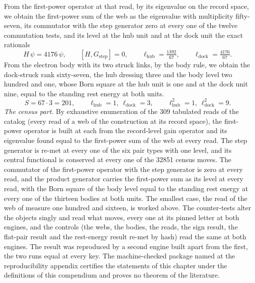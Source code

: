 \begin{chproof}
\begin{equation}
\end{equation}
From the first-power operator at that read, by its eigenvalue on the record space, we obtain the first-power sum of the web as the eigenvalue with multiplicity fifty-seven, its commutator with the step generator zero at every one of the twelve commutation tests, and its level at the hub unit and at the dock unit the exact rationals
\begin{equation}
H\,\psi = 4176\,\psi, \qquad [H, G_{\mathrm{step}}] = 0, \qquad \ell_{\mathrm{hub}} = \tfrac{1392}{67}, \qquad \ell_{\mathrm{dock}} = \tfrac{4176}{67} .
\end{equation}
From the electron body with its two struck links, by the body rule, we obtain the dock-struck rank sixty-seven, the hub dressing three and the body level two hundred and one, whose Born square at the hub unit is one and at the dock unit nine, equal to the standing rest energy at both units.
\begin{equation}
S = 67 \cdot 3 = 201, \qquad \ell_{\mathrm{hub}} = 1,\ \ell_{\mathrm{dock}} = 3, \qquad \ell_{\mathrm{hub}}^{2} = 1,\ \ell_{\mathrm{dock}}^{2} = 9 .
\end{equation}
\textit{The census part.}
By exhaustive enumeration of the 309 tabulated reads of the catalog (every read of a web of the construction at its record space), the first-power operator is built at each from the record-level gain operator and its eigenvalue found equal to the first-power sum of the web at every read. The step generator is re-met at every one of the six pair types with one level, and its central functional is conserved at every one of the 32851 census moves. The commutator of the first-power operator with the step generator is zero at every read, and the product generator carries the first-power sum as its level at every read, with the Born square of the body level equal to the standing rest energy at every one of the thirteen bodies at both units. The smallest case, the read of the web of measure one hundred and sixteen, is worked above.
The counter-tests alter the objects singly and read what moves, every one at its pinned letter at both engines, and the controls (the webs, the bodies, the reads, the sign result, the flat-pair result and the rest-energy result re-met by hash) read the same at both engines. The result was reproduced by a second engine built apart from the first, the two runs equal at every key.
The machine-checked package named at the reproducibility appendix certifies the statements of this chapter under the definitions of this compendium and proves no theorem of the literature.
\end{chproof}
